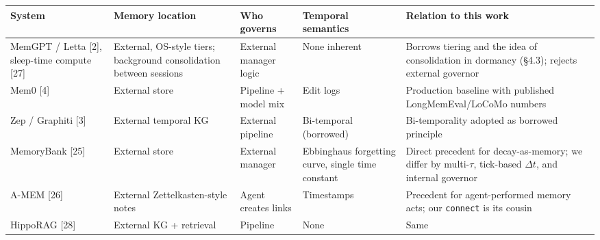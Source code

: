 \documentclass[
]{article}
\newcounter{none} %
\begin{document}
{\def\LTcaptype{none} %
\begin{longtable}[]{@{}
  >{\raggedright\arraybackslash}p{}
  >{\raggedright\arraybackslash}p{}
  >{\raggedright\arraybackslash}p{}
  >{\raggedright\arraybackslash}p{}
  >{\raggedright\arraybackslash}p{}@{}}
\toprule\noalign{}
\begin{minipage}[b]{\linewidth}\raggedright
System
\end{minipage} & \begin{minipage}[b]{\linewidth}\raggedright
Memory location
\end{minipage} & \begin{minipage}[b]{\linewidth}\raggedright
Who governs
\end{minipage} & \begin{minipage}[b]{\linewidth}\raggedright
Temporal semantics
\end{minipage} & \begin{minipage}[b]{\linewidth}\raggedright
Relation to this work
\end{minipage} \\
\midrule\noalign{}
\endhead
\bottomrule\noalign{}
\endlastfoot
MemGPT / Letta {[}2{]}, sleep-time compute {[}27{]} & External, OS-style
tiers; background consolidation between sessions & External manager
logic & None inherent & Borrows tiering and the idea of consolidation in
dormancy (§4.3); rejects external governor \\
Mem0 {[}4{]} & External store & Pipeline + model mix & Edit logs &
Production baseline with published LongMemEval/LoCoMo numbers \\
Zep / Graphiti {[}3{]} & External temporal KG & External pipeline &
Bi-temporal (borrowed) & Bi-temporality adopted as borrowed principle \\
MemoryBank {[}25{]} & External store & External manager & Ebbinghaus
forgetting curve, single time constant & Direct precedent for
decay-as-memory; we differ by multi-\(\tau\), tick-based \(\Delta t\),
and internal governor \\
A-MEM {[}26{]} & External Zettelkasten-style notes & Agent creates links
& Timestamps & Precedent for agent-performed memory acts; our
\texttt{connect} is its cousin \\
HippoRAG {[}28{]} & External KG + retrieval & Pipeline & None & Same

\end{longtable}}
\end{document}
